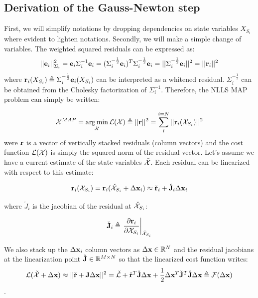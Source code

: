 \subsection{Derivation of the Gauss-Newton step}
First, we will simplify notations by dropping dependencies on state variables $X_{S_i}$ where evident to lighten notations. 
Secondly, we will make a simple change of variables. The weighted squared residuals can be expressed as:
\begin{equation}
    ||{\bf e}_i||^2_{\Sigma_i} = {\bf e}_i \Sigma_i^{-1} {\bf e}_i 
    = (\Sigma_i^{-\frac{1}{2}}{\bf e}_i)^T\Sigma_i^{-\frac{1}{2}}{\bf e}_i
    = ||\Sigma_i^{-\frac{1}{2}}{\bf e}_i||^2 = ||{\bf r}_i||^2
\end{equation}
where ${\bf r}_i(X_{S_i}) \triangleq \Sigma_i^{-\frac{1}{2}}{\bf e}_i(X_{S_i})$ can be interpreted as a whitened residual. $\Sigma_i^{-\frac{1}{2}}$ can be obtained
from the Cholesky factorization of $\Sigma_i^{-1}$. Therefore, the NLLS MAP problem can simply be written:

\begin{equation}
    \mathcal{X}^{MAP} = \operatorname*{arg\,min}_{\mathcal{X}} \mathcal{L}(\mathcal{X}) \triangleq||{\bf r}||^2 = \sum_i^{i=N} ||{\bf r}_i({\mathcal{X}_{S_i}})||^2 
\end{equation}
were ${\bf r}$ is a vector of vertically stacked residuals (column vectors) and the cost function $\mathcal{L}(\mathcal{X})$ is simply the squared norm 
of the residual vector. Let's assume we have a current estimate of the state variables $\check{\mathcal{X}}$.
Each residual can be linearized with respect to this estimate:

\begin{equation}
    {\bf r}_i(\mathcal{X}_{S_i}) = {\bf r}_i(\check{\mathcal{X}}_{S_i} + \Delta {\bf x}_i) \approx \check{{\bf r}}_i + \check{{\bf J}}_i \Delta {\bf x}_i
\end{equation}

where $\check{J}_i$ is the jacobian of the residual at $\check{\mathcal{X}}_{S_i}$: 

\begin{equation*}
    \check{{\bf J}}_i \triangleq \left.\frac{\partial {\bf r}_i}{\partial \mathcal{X}_{S_i}}\right|_{\check{\mathcal{X}}_{S_i}}
\end{equation*}

We also stack up the $\Delta {\bf x}_i$ column vectors as $\Delta {\bf x} \in \mathbb{R}^N$ and the residual jacobians at the linearization point 
$\check{{\bf J}} \in \mathbb{R}^{M \times N}$ so that the linearized cost function writes:  
%
\begin{equation}
    \mathcal{L}(\check{\mathcal{X}} + \Delta {\bf x}) 
    \approx ||\check{{\bf r}} + {\bf J} \Delta {\bf x}||^2 
    = \check{\mathcal{L}} +  \check{{\bf r}}^T \check{{\bf J}} \Delta {\bf x} + \frac{1}{2}\Delta {\bf x}^T \check{{\bf J}}^T \check{{\bf J}} \Delta {\bf x} 
    \triangleq \mathcal{F}(\Delta {\bf x})
\end{equation}.

